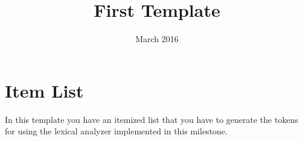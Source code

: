 \documentclass{article}
\begin{document}
\title{First Template}
\date{March 2016}
\maketitle


\section{Item List}
In this template you have an itemized list that you have to generate the tokens for using the lexical analyzer implemented in this milestone. \\
\end{document}
